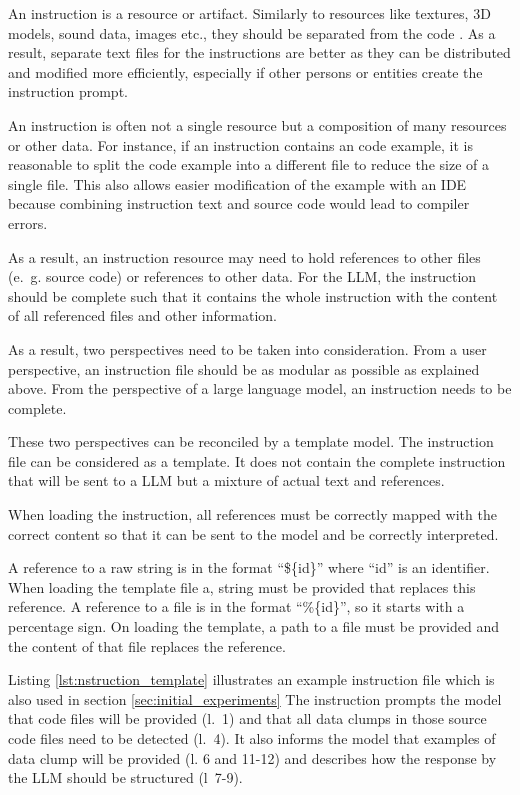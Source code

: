 An instruction is a resource or artifact. Similarly to resources like textures, 3D models, sound data, images etc., they should be separated from the code \cite{separate_code_data}. As a result, separate text files for the instructions are better as they can be distributed and modified more efficiently, especially if other persons or entities create the instruction prompt.

An instruction is often not a single resource but a composition of many resources or other data. For instance, if an instruction contains an code example, it is reasonable to split the code example into a different file to reduce the size of a single file. This  also allows easier modification of the example with an IDE because combining instruction text and source code would lead to compiler errors.

As a result, an instruction resource may need to hold references to other files (e.~g. source code) or references to other data.
For the \ac{LLM}, the instruction should be complete such that it contains the whole instruction with the content of all referenced files and other information.

As a result, two perspectives need to be taken into consideration. From a user perspective, an instruction file should be as modular as possible as explained above. From the perspective of a large language model, an instruction needs to be complete. 

These two perspectives can be reconciled by a template model. The instruction file can be considered as a template. It does not contain the complete instruction that will be sent to a \ac{LLM} but a mixture of actual text and references.

When loading the instruction, all references must be correctly mapped with the correct content so that it can be sent to the model and be correctly interpreted. 

A reference to a raw string is in the format \enquote{\$\{id\}} where \enquote{id} is an identifier. When loading the template file a, string must be provided that replaces this reference.  A reference to a file is in the format \enquote{\%\{id\}}, so it starts with a percentage sign. On loading the template, a path to a file must be  provided and the content of that file replaces the reference. 

Listing \ref{lst:nstruction_template} illustrates an example instruction file which is also used in section \ref{sec:initial_experiments} The instruction prompts the model that code files will be provided (l.~1) and that all data clumps in those source code files need to be detected (l.~4). It also informs the model that examples of data clump will be provided (l. 6 and 11-12) and describes how the response by the \ac{LLM} should be structured (l~7-9). 

